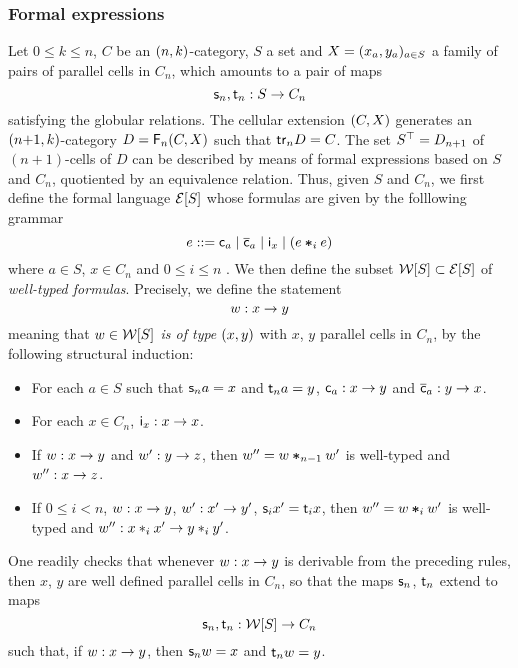 \subsubsection{Formal expressions}\label{ssubsec:formex}
Let $0\leq k\leq n$, $C$ be an $(n,k)$-category, $S$ a set and $X=(x_a,y_a)_{a\in S}$
a family of pairs of parallel cells in $C_n$, which amounts to a pair
of maps
\[\mathsf{s}_{n},\mathsf{t}_{n}:S\to C_n\]
satisfying the globular relations. The cellular extension
$(C,X)$ generates an $(n{+}1,k)$-category $D=\mathsf{F}_{n}(C,X)$ such that $\mathsf{tr}_{n} D=C$. The set $S^\top=D_{n+1}$ of
$(n{+}1)$-cells of $D$ can be described by means of formal expressions
based on $S$ and $C_n$, quotiented by an equivalence relation. Thus,
given $S$ and $C_n$, we first define the formal language $\mathcal{E}[S]$
whose formulas are given by the folllowing grammar
\[
  e ::= \mathsf{c}_{a} \mid \overline{\mathsf{c}}_{a} \mid \mathsf{i}_{x} \mid (e\bm{\ast}_{i} e)
\]
where $a\in S$, $x\in C_n$ and $0\leq i\leq n$ . We then define the
subset  $\mathcal{W}[S]\subset\mathcal{E}[S]$ of {\em well-typed formulas}.
Precisely, we define the statement
\[w:x\to y\]
meaning that {\em $w\in\mathcal{W}[S]$ is of type $(x,y)$} with $x$, $y$ parallel
cells in $C_n$, by the following structural induction:
\begin{itemize}
\item For each $a\in S$ such that $\mathsf{s}_{n} a=x$ and $\mathsf{t}_{n} a=y$,
  $\mathsf{c}_{a}:x\to y$
  and $\overline{\mathsf{c}}_{a}:y\to x$.
\item For  each $x\in C_n$, $\mathsf{i}_{x}:x\to x$.
 \item If $w:x\to y$ and $w':y\to z$, then $w''=w\bm{\ast}_{n-1}w'$ is
   well-typed and $w'':x\to z$.
 \item If $0\leq i<n$, $w:x\to y$, $w':x'\to y'$, $\mathsf{s}_{i}{x'}=\mathsf{t}_{i}{x}$, then $w''=w\bm{\ast}_{i} w'$ is well-typed and
   $w'':x\ast_{i} x'\to y\ast_{i} y'$. 
 \end{itemize}
 One readily checks that whenever $w:x\to y$ is derivable from the
 preceding rules, then $x$, $y$ are well defined parallel cells in
 $C_n$, so that the maps $\mathsf{s}_{n}$, $\mathsf{t}_{n}$ extend to maps
 \[\mathsf{s}_{n}, \mathsf{t}_{n} :\mathcal{W}[S]\to C_n\]
 such that, if $w:x\to y$,  then $\mathsf{s}_{n} w=x$ and $\mathsf{t}_{n} w=y$. 








 
 
 
